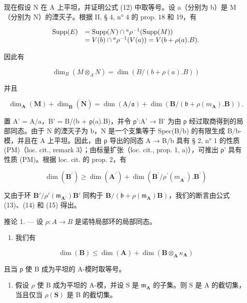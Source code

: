 现在假设 N 在 A 上平坦，并证明公式 (12) 中取等号。设 a（分别为 b）是 M（分别为 N）的湮灭子。根据 II, § 4, n° 4 的 prop. 18 和 19，有

\[
\begin{array}{r l} \operatorname{Supp} (E) & = \operatorname{Supp} (N) \cap {} ^ {a} \rho^ {- 1} (\operatorname{Supp} (M)) \\ & = V (b) \cap {} ^ {a} \rho^ {- 1} (V (a)) = V (b + \rho (a). B). \end{array}
\]

因此有

\[
\dim_ {B} (M \otimes_ {A} N) = \dim (B / (b + \rho (a). B))\tag{13}
\]

并且

\[
\dim_ {\mathbf {A}} (\mathbf {M}) + \dim_ {\overline {{\mathbf {B}}}} (\overline {{\mathbf {N}}}) = \dim (\mathrm{A} / \mathfrak {a}) + \dim (\mathbf {B} / (\mathfrak {b} + \rho (m _ {\mathbf {A}}). \mathbf {B}))  .\tag{14}
\]

置 A' = A/a，B' = B/(b + ρ(a).B)，并令 ρ':A' → B' 为由 ρ 经过取商得到的局部同态。由于 N 的湮灭子为 b，N 是一个支集等于 Spec(B/b) 的有限生成 B/b-模，并且在 A 上平坦。因此，由 ρ 导出的同态 A → B/b 具有 § 2, n° 1 的性质 (PM)（loc. cit., remark 3）；由标量扩张（loc. cit., prop. 1, a)），可推出 ρ' 具有性质 (PM)。根据 loc. cit. 的 prop. 2，有

\[
\dim (\mathbf {B} ^ {\prime}) \geqslant \dim (\mathbf {A} ^ {\prime}) + \dim (\mathbf {B} ^ {\prime} / \rho^ {\prime} (m _ {\mathbf {A} ^ {\prime}}). \mathbf {B} ^ {\prime})\tag{15}
\]

又由于环 \(\mathbf{B}'/\rho'(\mathfrak{m}_{\mathbf{A}'})\mathbf{B}'\) 同构于 \(\mathbf{B}/(\mathfrak{b} + \rho(\mathfrak{m}_{\mathbf{A}})\mathbf{B})\)，我们的断言由公式 (13)、(14) 和 (15) 得出。

推论 1. --- 设 \(\rho: A \to B\) 是诺特局部环的局部同态。

\begin{enumerate}
\def\labelenumi{\alph{enumi})}
\tightlist
\item
  我们有
\end{enumerate}

\[
\dim (\mathbf {B}) \leqslant \dim (\mathbf {A}) + \dim (\mathbf {B} \otimes_ {\mathbf {A}} \kappa_ {\mathbf {A}})\tag{16}
\]

且当 ρ 使 B 成为平坦的 A-模时取等号。

\begin{enumerate}
\def\labelenumi{\alph{enumi})}
\setcounter{enumi}{1}
\tightlist
\item
  假设 \(\rho\) 使 B 成为平坦的 A-模，并设 S 是 \(\mathfrak{m}_{\mathbf{A}}\) 的子集。则 S 是 A 的截切集，当且仅当 \(\rho(\mathbf{S})\) 是 B 的截切集。
\end{enumerate}

